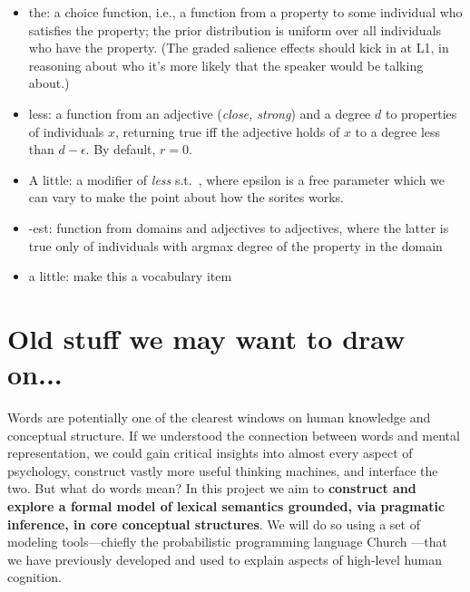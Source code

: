 \documentclass[12pt]{article}
\begin{document}
\begin{itemize}
\item the: a choice function, i.e., a function from a property to some individual who satisfies the property; the prior distribution is uniform over all individuals who have the property. (The graded salience effects should kick in at L1, in reasoning about who it's more likely that the speaker would be talking about.)
\item less: a function from an adjective (\emph{close, strong}) and a degree $d$ to properties of individuals $x$, returning true iff the adjective holds of $x$ to a degree less than $d - \epsilon$. By default, $r = 0$. 
\item A little: a modifier of \emph{less} s.t.\ , where epsilon is a free parameter which we can vary to make the point about how the sorites works.
\item -est: function from domains and adjectives to adjectives, where the latter is true only of individuals with argmax degree of the property in the domain
\item a little: make this a vocabulary item  
\end{itemize} 

\appendix

\section{Old stuff we may want to draw on...}


Words are potentially one of the clearest windows on human knowledge and conceptual structure. If we understood the connection between words and mental representation, we could gain critical insights into almost every aspect of psychology, construct vastly more useful thinking machines, and interface the two. But what do words mean? In this project we aim to {\bf construct and explore a formal model of lexical semantics grounded, via pragmatic inference, in core conceptual structures}. We will do so using a set of modeling tools---chiefly the probabilistic programming language Church \cite{goodman2008}---that we have previously developed and used to explain  aspects of high-level human cognition.
\end{document}
